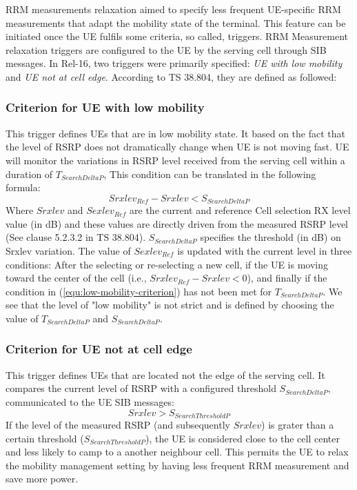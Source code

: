 \documentclass[conference]{IEEEtran}
\begin{document}
 RRM measurements relaxation aimed to specify less frequent UE-specific RRM measurements that adapt the mobility state of the terminal. This feature can be initiated once the UE fulfils some criteria, so called, triggers. RRM Measurement relaxation triggers are configured to the UE by the serving cell through SIB messages. In Rel-16, two triggers were primarily specified: \textit{UE with low mobility} and \textit{UE not at cell edge}. According to TS 38.804, they are defined as followed:\\

\subsubsection*{\textbf{Criterion for UE with low mobility}} This trigger defines UEs that are in low mobility state. It based on the fact that the level of RSRP does not dramatically change when UE is not moving fast. UE will monitor the variations in RSRP level received from the serving cell within a duration of $T_{SearchDeltaP}$, This condition can be translated in the following formula:
\begin{equation}
Srxlev_{Ref}-Srxlev<S_{SearchDeltaP}
\label{equ:low-mobility-criterion}
\end{equation}
Where $Srxlev$ and $Sexlev_{Ref}$ are the current and reference Cell selection RX level value (in dB) and these values are directly driven from the measured RSRP level (See clause 5.2.3.2 in TS 38.804). $S_{SearchDeltaP}$ specifies the threshold (in dB) on Srxlev variation. The value of $Sexlev_{Ref}$ is updated with the current level in three conditions: After the selecting or re-selecting a new cell, if the UE is moving toward the center of the cell (i.e., $Srxlev_{Ref}-Srxlev<0$), and finally if the condition in (\ref{equ:low-mobility-criterion}) has not been met for $T_{SearchDeltaP}$. We see that the level of "low mobility" is not strict and is defined by choosing the value of $T_{SearchDeltaP}$ and  $S_{SearchDeltaP}$.\\
\subsubsection*{\textbf{Criterion for UE not at cell edge}} This trigger defines UEs that are located not the edge of the serving cell. It compares the current level of RSRP with a configured threshold $S_{SearchDeltaP}$, communicated to the UE SIB messages:
\begin{equation}
Srxlev>S_{SearchThresholdP}
\label{equ:not-at-the-edge-criterion}
\end{equation}
If the level of the measured RSRP (and subsequently $Srxlev$) is grater than a certain threshold ($S_{SearchThresholdP}$), the UE is considered close to the cell center and less likely to camp to a another neighbour cell. This permits the UE to relax the mobility management setting by having less frequent RRM measurement and save more power.
\end{document}
